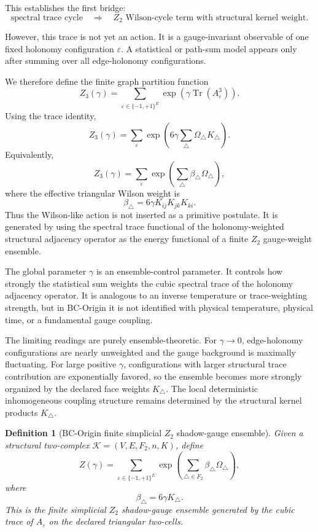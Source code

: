 \documentclass[11pt]{article}
\newtheorem{definition}{Definition}
\begin{document}
This establishes the first bridge:
\[
\text{spectral trace cycle}\quad\Longrightarrow\quad
\text{$Z_2$ Wilson-cycle term with structural kernel weight}.
\]

However, this trace is not yet an action. It is a gauge-invariant observable of one fixed holonomy configuration $\varepsilon$. A statistical or path-sum model appears only after summing over all edge-holonomy configurations.

We therefore define the finite graph partition function
\[
Z_3(\gamma)=\sum_{\varepsilon\in\{-1,+1\}^{E}}
\exp\left(\gamma\operatorname{Tr}(A_\varepsilon^3)\right).
\]
Using the trace identity,
\[
Z_3(\gamma)=\sum_{\varepsilon}\exp\left(6\gamma\sum_{\triangle}\Omega_\triangle K_\triangle\right).
\]
Equivalently,
\[
Z_3(\gamma)=\sum_{\varepsilon}\exp\left(\sum_{\triangle}\beta_\triangle\Omega_\triangle\right),
\]
where the effective triangular Wilson weight is
\[
\beta_\triangle=6\gamma K_{ij}K_{jk}K_{ki}.
\]
Thus the Wilson-like action is not inserted as a primitive postulate. It is generated by using the spectral trace functional of the holonomy-weighted structural adjacency operator as the energy functional of a finite $Z_2$ gauge-weight ensemble.

The global parameter $\gamma$ is an ensemble-control parameter. It controls how strongly the statistical sum weights the cubic spectral trace of the holonomy adjacency operator. It is analogous to an inverse temperature or trace-weighting strength, but in BC-Origin it is not identified with physical temperature, physical time, or a fundamental gauge coupling.

The limiting readings are purely ensemble-theoretic. For $\gamma\to 0$, edge-holonomy configurations are nearly unweighted and the gauge background is maximally fluctuating. For large positive $\gamma$, configurations with larger structural trace contribution are exponentially favored, so the ensemble becomes more strongly organized by the declared face weights $K_\triangle$. The local deterministic inhomogeneous coupling structure remains determined by the structural kernel products $K_\triangle$.

\begin{definition}[BC-Origin finite simplicial $Z_2$ shadow-gauge ensemble]
Given a structural two-complex $\mathcal K=(V,E,F_2,n,K)$, define
\[
Z(\gamma)=\sum_{\varepsilon\in\{-1,+1\}^E}
\exp\left(\sum_{\triangle\in F_2}\beta_\triangle\Omega_\triangle\right),
\]
where
\[
\beta_\triangle=6\gamma K_\triangle.
\]
This is the finite simplicial $Z_2$ shadow-gauge ensemble generated by the cubic trace of $A_\varepsilon$ on the declared triangular two-cells.
\end{definition}
\end{document}
